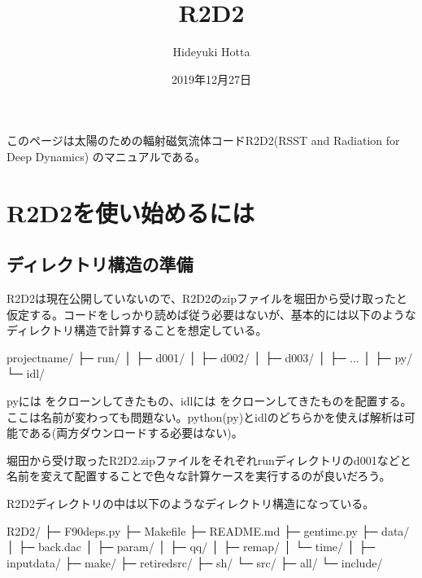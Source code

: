 \documentclass[letterpaper,10pt,dvipdfmx,report]{sphinxmanual}
\title{R2D2}
\date{2019年12月27日}
\author{Hideyuki Hotta}
\let\sphinxpxdimen\pdfpxdimen\else\newdimen\sphinxpxdimen
\begin{document}
\pagestyle{empty}
\sphinxmaketitle
\pagestyle{plain}
\sphinxtableofcontents
\pagestyle{normal}
\label{\detokenize{index::doc}}


このページは太陽のための輻射磁気流体コードR2D2(RSST and Radiation for Deep Dynamics)
のマニュアルである。


\noindent\sphinxincludegraphics[width=350\sphinxpxdimen]{{R2D2_logo}.png}


\chapter{R2D2を使い始めるには}
\label{\detokenize{start:r2d2}}\label{\detokenize{start::doc}}

\section{ディレクトリ構造の準備}
\label{\detokenize{start:id1}}
R2D2は現在公開していないので、R2D2のzipファイルを堀田から受け取ったと仮定する。コードをしっかり読めば従う必要はないが、基本的には以下のようなディレクトリ構造で計算することを想定している。

\begin{sphinxVerbatim}[commandchars=\\\{\}]
project\PYGZus{}name/
           ├─ run/
           │    ├─ d001/
           │    ├─ d002/
           │    ├─ d003/
           │    ├─ ...
           │
           ├─ py/
           └─ idl/
\end{sphinxVerbatim}

pyには  をクローンしてきたもの、idlには  をクローンしてきたものを配置する。ここは名前が変わっても問題ない。python(py)とidlのどちらかを使えば解析は可能である(両方ダウンロードする必要はない)。

堀田から受け取ったR2D2.zipファイルをそれぞれrunディレクトリのd001などと名前を変えて配置することで色々な計算ケースを実行するのが良いだろう。

R2D2ディレクトリの中は以下のようなディレクトリ構造になっている。

\begin{sphinxVerbatim}[commandchars=\\\{\}]
R2D2/
   ├─ F90\PYGZus{}deps.py
   ├─ Makefile
   ├─ README.md
   ├─ gen\PYGZus{}time.py
   ├─ data/
   │    ├─ back.dac
   │    ├─ param/
   │    ├─ qq/
   │    ├─ remap/
   │    └─ time/
   │
   ├─ input\PYGZus{}data/
   ├─ make/
   ├─ retired\PYGZus{}src/
   ├─ sh/
   └─ src/
        ├─ all/
        └─ include/
\end{sphinxVerbatim}
\end{document}
